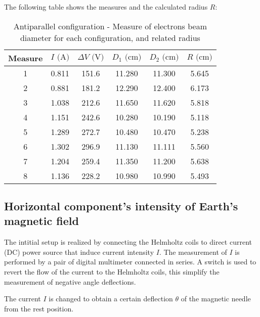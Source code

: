 The following table shows the measures and the calculated radius $R$:
\begin{table}[!htbp]
    {\par\centering
    \begin{tabular}{cccccc}
        \hline
        Measure & $I \text{ (A)}$ & $\Delta V \text{ (V)}$ & $D_1 \text{ (cm)}$ & $D_2 \text{ (cm)}$ & $R \text{ (cm)}$\\
        \hline
        1   &   0.811&   151.6&  11.280&  11.300& 5.645\\
        2   &   0.881&   181.2&  12.290&  12.400& 6.173\\
        3   &   1.038&   212.6&  11.650&  11.620& 5.818\\
        4   &   1.151&   242.6&  10.280&  10.190& 5.118\\
        5   &   1.289&   272.7&  10.480&  10.470& 5.238\\
        6   &   1.302&   296.9&  11.130&  11.111& 5.560\\
        7   &   1.204&   259.4&  11.350&  11.200& 5.638\\
        8   &   1.136&   228.2&  10.980&  10.990& 5.493\\
        \hline
    \end{tabular}
    \par}
    \caption{Antiparallel configuration - Measure of electrons beam diameter for each configuration, and related radius}
\end{table}


\subsection{Horizontal component's intensity of Earth's magnetic field}
The intitial setup is realized by connecting the Helmholtz coils to direct current (DC) power source that induce current intensity $I$.
The measurement of $I$ is performed by a pair of digital multimeter connected in series.
A switch is used to revert the flow of the current to the Helmholtz coils, this simplify the measurement of negative 
angle deflections.

The current $I$ is changed to obtain a certain deflection $\theta $ of the magnetic needle from the rest position.

